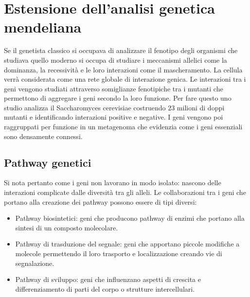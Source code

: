 \chapter{Estensione dell'analisi genetica mendeliana}
Se il genetista classico si occupava di analizzare il fenotipo degli organismi che studiava quello moderno si occupa di studiare i meccanismi allelici come la dominanza, la 
recessivit\`a e le loro interazioni come il mascheramento. La cellula verr\`a considerata come una rete globale di interazione genica. Le interazioni tra i geni vengono studiati 
attraverso somiglianze fenotipiche tra i mutanti che permettono di aggregare i geni secondo la loro funzione. Per fare questo uno studio analizza il Saccharomyces cerevisiae costruendo
$23$ milioni di doppi mutanti e identificando  interazioni positive e  negative. I geni vengono poi raggruppati per funzione in un metagenoma che
evidenzia come i geni essenziali sono densamente connessi. 
\section{Pathway genetici}
Si nota pertanto come i geni non lavorano in modo isolato: nascono delle interazioni complicate dalle diversit\`a tra gli alleli. Le collaborazioni tra i geni che portano alla
creazione dei pathway possono essere di tipi diversi:
\begin{itemize}
	\item Pathway biosintetici: geni che producono pathway di enzimi che portano alla sintesi di un composto molecolare.
	\item Pathway di trasduzione del segnale: geni che apportano piccole modifiche a molecole permettendo il loro trasporto e localizzazione creando vie di segnalazione.
	\item Pathway di sviluppo: geni che influenzano aspetti di crescita e differenziamento di parti del corpo o strutture intercellulari.
\end{itemize}
